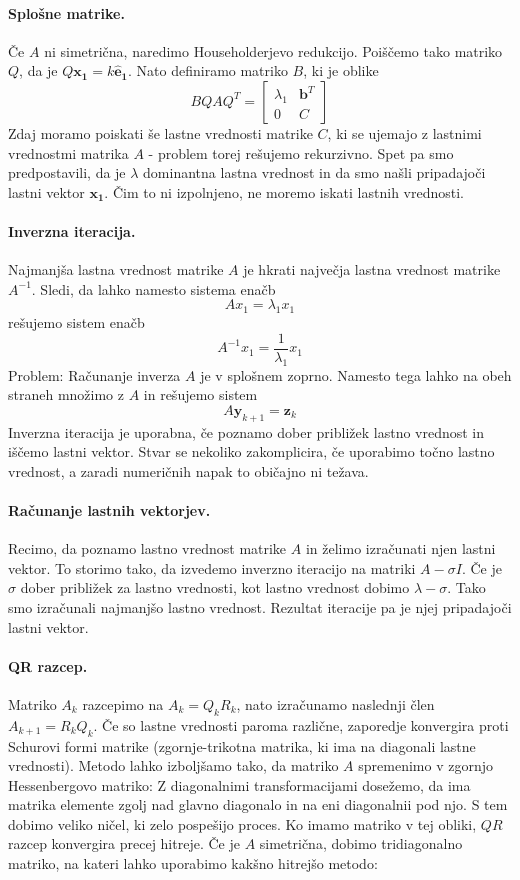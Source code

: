 \documentclass[a4paper]{article}
\begin{document}
\paragraph{Splošne matrike.} Če $A$ ni simetrična, naredimo Householderjevo redukcijo. Poiščemo tako matriko $Q$, da je $Q\mathbf{x_1} = k\mathbf{\hat{e}_1}$.
Nato definiramo matriko $B$, ki je oblike $$B QAQ^T= \begin{bmatrix}
    \lambda_1 & \mathbf{b}^T \\
    0 & C
\end{bmatrix}$$
Zdaj moramo poiskati še lastne vrednosti matrike $C$, ki se ujemajo z lastnimi vrednostmi matrika \(A\) - problem torej rešujemo rekurzivno. Spet pa smo predpostavili, da je $\lambda$ dominantna lastna vrednost in da smo našli
pripadajoči lastni vektor $\mathbf{x_1}$. Čim to ni izpolnjeno, ne moremo iskati lastnih vrednosti.
\paragraph{Inverzna iteracija.} Najmanjša lastna vrednost matrike $A$ je hkrati največja lastna vrednost matrike $A^{-1}$. Sledi, da lahko namesto sistema enačb $$Ax_1 = \lambda_1x_1$$
rešujemo sistem enačb $$A^{-1}x_1 = \frac{1}{\lambda_1}x_1$$
Problem: Računanje inverza $A$ je v splošnem zoprno. Namesto tega lahko na obeh straneh množimo z $A$ in rešujemo sistem $$A\mathbf{y}_{k+1} = \mathbf{z}_k$$
Inverzna iteracija je uporabna, če poznamo dober približek lastno vrednost in iščemo lastni vektor. Stvar se nekoliko zakomplicira, če uporabimo točno lastno vrednost, a zaradi numeričnih
napak to običajno ni težava.
\paragraph{Računanje lastnih vektorjev.} Recimo, da poznamo lastno vrednost matrike \(A\) in želimo izračunati njen lastni vektor. To storimo tako, da izvedemo inverzno iteracijo
na matriki \(A - \sigma I\). Če je \(\sigma\) dober približek za lastno vrednosti, kot lastno vrednost dobimo \(\lambda - \sigma\). Tako smo izračunali najmanjšo lastno vrednost. Rezultat iteracije pa je njej pripadajoči lastni vektor.
\paragraph{QR razcep.} Matriko $A_k$ razcepimo na $A_k = Q_kR_k$, nato izračunamo naslednji člen $A_{k+1} = R_kQ_k$. Če so lastne vrednosti paroma različne, zaporedje konvergira proti Schurovi formi matrike (zgornje-trikotna matrika, ki ima na diagonali lastne vrednosti).
Metodo lahko izboljšamo tako, da matriko $A$ spremenimo v zgornjo Hessenbergovo matriko: Z diagonalnimi transformacijami dosežemo, da ima matrika elemente zgolj nad glavno diagonalo in na eni diagonalnii pod njo. S tem dobimo veliko ničel, ki zelo pospešijo proces.
Ko imamo matriko v tej obliki, $QR$ razcep konvergira precej hitreje. Če je $A$ simetrična, dobimo tridiagonalno matriko, na kateri lahko uporabimo kakšno hitrejšo metodo:
\end{document}
